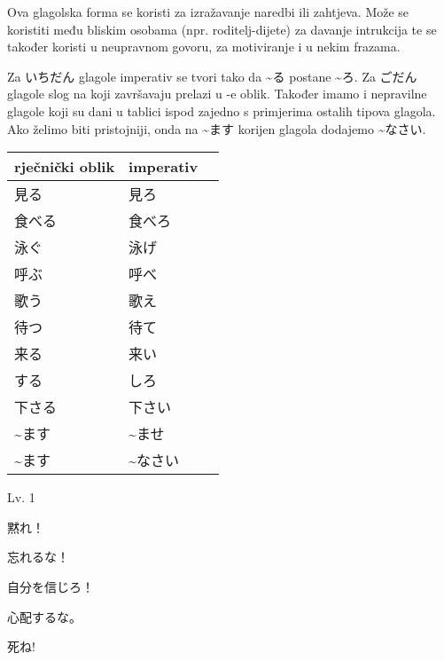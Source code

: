 
\author{Tomislav Mamić}

	
	Ova glagolska forma se koristi za izražavanje naredbi ili zahtjeva. Može se koristiti među bliskim osobama (npr. roditelj-dijete) za davanje intrukcija te se također koristi u neupravnom govoru, za motiviranje i u nekim frazama.
	
	
	Za いちだん glagole imperativ se tvori tako da \textasciitilde る postane \textasciitilde ろ. Za ごだん glagole slog na koji završavaju prelazi u -e oblik. Također imamo i nepravilne glagole koji su dani u tablici ispod zajedno s primjerima ostalih tipova glagola.  Ako želimo biti pristojniji, onda na \textasciitilde ます korijen glagola dodajemo \textasciitilde なさい.
	
	\begin{table}[h]
		\centering
		\begin{tabular}{l l l}\toprule[2pt]
			rječnički oblik & imperativ\\
			\midrule
			見る　& 見ろ\\
			食べる & 食べろ\\
			\midrule
			泳ぐ & 泳げ\\
			呼ぶ  &  呼べ\\
			歌う  & 歌え\\
			待つ & 待て & \\
			\midrule
			来る & 来い & \\
			する & しろ\\
			下さる & 下さい\\
			\midrule
			\textasciitilde ます & \textasciitilde ませ\\
			\textasciitilde ます & \textasciitilde なさい\\
			\bottomrule[2pt]
		\end{tabular}
	\end{table}

	\newpage		

	\begin{mondai}{Lv. 1}
		\item 黙れ！
		\item 忘れるな！
		\item 自分を信じろ！
		\item 心配するな。
		\item 死ね!
	\end{mondai}

